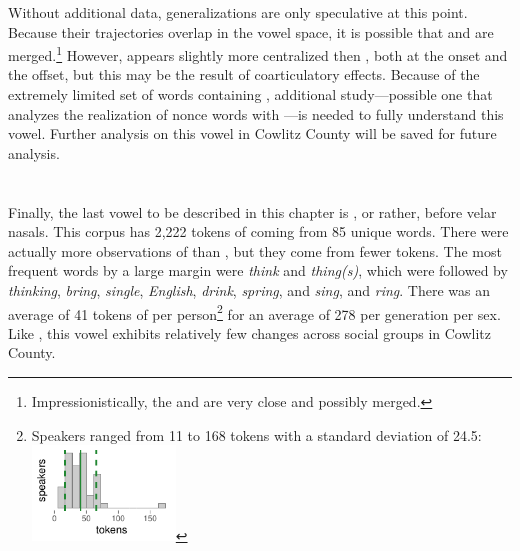 Without additional data, generalizations are only speculative at this point. Because their trajectories overlap in the vowel space, it is possible that \beng and \bang are merged.\footnote{Impressionistically, the \bang and \beng are very close and possibly merged.} However, \beng appears slightly more centralized then \bang, both at the onset and the offset, but this may be the result of coarticulatory effects. Because of the extremely limited set of words containing \beng, additional study---possible one that analyzes the realization of nonce words with \beng---is needed to fully understand this vowel. Further analysis on this vowel in Cowlitz County will be saved for future analysis.






\section{\bing}
\label{BING}

Finally, the last vowel to be described in this chapter is \bing, or rather, \kit before velar nasals. This corpus has 2,222 tokens of \bing coming from 85 unique words. There were actually more observations of \bing than \bin, but they come from fewer tokens. The most frequent words by a large margin were \textit{think} and \textit{thing(s)}, which were followed by \textit{thinking}, \textit{bring}, \textit{single}, \textit{English}, \textit{drink}, \textit{spring}, and \textit{sing}, and \textit{ring}. There was an average of 41 tokens of \bing per person\footnote{Speakers ranged from 11 to 168 tokens with a standard deviation of 24.5: \includegraphics[width = 1.5in]{Figures/BING/BING_tiny.pdf}} for an average of 278 per generation per sex. Like \bin, this vowel exhibits relatively few changes across social groups in Cowlitz County.


